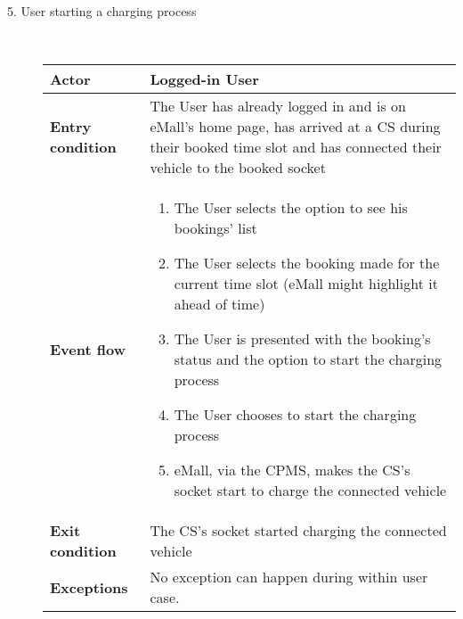 \documentclass[11pt]{article}
\begin{document}
\begin{description}
    \item [5. User starting a charging process] \hfill \\
    \begin{table}[H]
        \centering
        \setlength{\tabcolsep}{18pt}
        \renewcommand{\arraystretch}{1.4}
        \begin{tabularx}{\textwidth}{|>{\hsize=0.5\hsize}X|>{\hsize=1.5\hsize}X|}
            \hline
            \textbf{Actor} & Logged-in User \\
            \hline
            \textbf{Entry condition} & The User has already logged in and is on eMall's home page, has arrived at a CS during their booked time slot and has connected their vehicle to the booked socket \\
            \hline
            \textbf{Event flow} & 
                \begin{minipage}[t]{\hsize}
                \begin{enumerate}[topsep=0pt, leftmargin=*]
                    \item The User selects the option to see his bookings' list
                    \item The User selects the booking made for the current time slot (eMall might highlight it ahead of time)
                    \item The User is presented with the booking's status and the option to start the charging process
                    \item The User chooses to start the charging process
                    \item eMall, via the CPMS, makes the CS's socket start to charge the connected vehicle
                \end{enumerate}
                \end{minipage}
                \vspace{6pt}
            \\
            \hline
            \textbf{Exit condition} & The CS's socket started charging the connected vehicle \\
            \hline
            \textbf{Exceptions} & No exception can happen during within user case. \\
            \hline
        \end{tabularx}
    \end{table}
    

\end{description}
\end{document}
